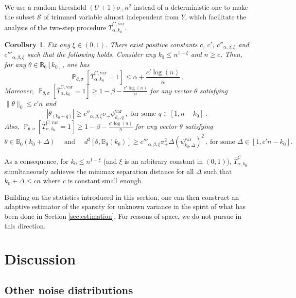 \documentclass[twoside,11pt]{article}
\newtheorem{cor}{Corollary}
\def\beq{\begin{equation}}
\def\eeq{\end{equation}}
\def\cS{\mathcal{S}}
\def\bbB{\mathbb{B}}
\renewcommand{\P}{\operatorname{\mathbb{P}}}
\newcommand{\<}{\langle}
\renewcommand{\>}{\rangle}
\begin{document}
We use a random threshold $(U+1)\sigma_+ n^2$ instead of a deterministic one to make the subset $\cS$ of trimmed variable almost independent from $Y$, which facilitate the analysis of the two-step procedure  $\overline{T}^{C,\mathrm{var}}_{\alpha,k_0}$.





 


\begin{cor}\label{cor:power_combined2ubv2}
Fix any $\xi\in (0,1)$.
 There exist  positive constants $c$, $c'$, $c''_{\alpha,\beta,\xi}$ and $c'''_{\alpha,\beta,\xi}$ such that the following holds. Consider any $k_0\leq n^{1-\xi}$ and $n\geq c$. 
 Then, for any $\theta\in \bbB_{0}[k_0]$, one has 
 \[
  \P_{\theta,\sigma}[\overline{T}^{C,\mathrm{var}}_{\alpha,k_0}=1]\leq \alpha + \frac{c'\log(n)}{n}\ . 
 \]
Moreover,
 $\P_{\theta,\sigma}[\overline{T}^{C,\mathrm{var}}_{\alpha,k_0}=1]\geq 1-\beta-\frac{c'\log(n)}{n}$ for any vector $\theta$ satisfying $\|\theta\|_0\leq c'n$ and
 \beq\label{eq:upper_adaptatif_linfiniuv}
 |\theta_{(k_0+q)}| \geq c''_{\alpha,\beta,\xi}\sigma_+\psi_{k_0,q}^{\mathrm{var}}\ , \text{ for some } q\in [1,n-k_0]\ .
 \eeq
  Also,  $\P_{\theta,\sigma}[\overline{T}^{C,\mathrm{var}}_{\alpha,k_0}=1]\geq 1-\beta-\frac{c'\log(n)}{n}$ for any vector $\theta$ satisfying  
 \beq\label{eq:upper_adaptatif_l2uv}
  \theta\in \mathbb{B}_0(k_0+\Delta)\quad  \text{ and }\quad  d^2[\theta,\mathbb{B}_0(k_0)] \geq c'''_{\alpha,\beta,\xi} \sigma_+^2\Delta(\psi_{k_0,\Delta}^{\mathrm{var}})^2\ ,\, \text{for some $\Delta\in [1,c'n-k_0]$.}
 \eeq
\end{cor}
 

 
 As a consequence, for $k_0\leq n^{1-\xi}$ (and $\xi$ is an arbitrary constant in $(0,1)$), $\overline{T}^{C}_{\alpha,k_0}$ simultaneously achieves the minimax separation distance for all $\Delta$ such that  $k_0+\Delta\leq c n$ where $c$ is constant small enough. 
 
Building on the statistics introduced in this section, one can  then construct an adaptive estimator of the sparsity for unknown variance in the spirit of what has been done in Section \ref{sec:estimation}. For reasons of space, we do not pursue in this direction.  


\section{Discussion}


\subsection{Other noise distributions}
\end{document}
